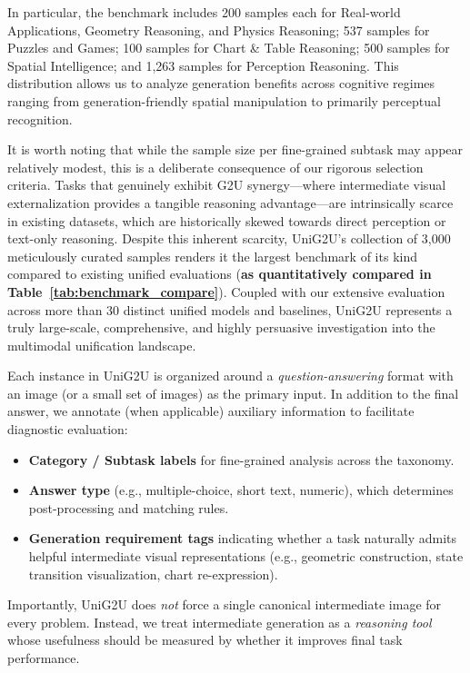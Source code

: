 \documentclass{article}
\theoremstyle{plain}
\theoremstyle{definition}
\theoremstyle{remark}
\begin{document}
In particular, the benchmark includes 200 samples each for Real-world Applications, Geometry Reasoning, and Physics Reasoning; 537 samples for Puzzles and Games; 100 samples for Chart \& Table Reasoning; 500 samples for Spatial Intelligence; and 1,263 samples for Perception Reasoning. This distribution allows us to analyze generation benefits across cognitive regimes ranging from generation-friendly spatial manipulation to primarily perceptual recognition.

It is worth noting that while the sample size per fine-grained subtask may appear relatively modest, this is a deliberate consequence of our rigorous selection criteria. Tasks that genuinely exhibit G2U synergy---where intermediate visual externalization provides a tangible reasoning advantage---are intrinsically scarce in existing datasets, which are historically skewed towards direct perception or text-only reasoning. Despite this inherent scarcity, UniG2U's collection of 3,000 meticulously curated samples renders it the largest benchmark of its kind compared to existing unified evaluations (\textbf{as quantitatively compared in Table~\ref{tab:benchmark_compare}}). Coupled with our extensive evaluation across more than 30 distinct unified models and baselines, UniG2U represents a truly large-scale, comprehensive, and highly persuasive investigation into the multimodal unification landscape.


Each instance in UniG2U is organized around a \emph{question-answering} format with an image (or a small set of images) as the primary input. In addition to the final answer, we annotate (when applicable) auxiliary information to facilitate diagnostic evaluation:
\begin{itemize}
    \item \textbf{Category / Subtask labels} for fine-grained analysis across the taxonomy.
    \item \textbf{Answer type} (e.g., multiple-choice, short text, numeric), which determines post-processing and matching rules.
    \item \textbf{Generation requirement tags} indicating whether a task naturally admits helpful intermediate visual representations (e.g., geometric construction, state transition visualization, chart re-expression).
\end{itemize}

Importantly, UniG2U does \emph{not} force a single canonical intermediate image for every problem. Instead, we treat intermediate generation as a \emph{reasoning tool} whose usefulness should be measured by whether it improves final task performance.
\end{document}
